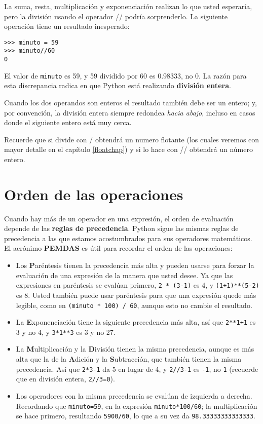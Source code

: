 La suma, resta, multiplicación y exponenciación realizan lo que usted
esperaría, pero la división usando el operador // podría sorprenderlo.
La siguiente operación tiene un resultado inesperado:

\begin{lstlisting}
>>> minuto = 59
>>> minuto//60
0
\end{lstlisting}

El valor de \texttt{minuto} es 59, y 59 dividido por 60 es 0.98333,
no 0. La razón para esta discrepancia radica en que Python está realizando
\textbf{división entera}.


Cuando los dos operandos son enteros el resultado también debe ser
un entero; y, por convención, la división entera siempre redondea
{\em hacia abajo}, incluso en casos donde el siguiente entero está
muy cerca.

Recuerde que si divide con / obtendrá un numero flotante (los cuales
veremos con mayor detalle en el capítulo \ref{floatchap}) y si lo
hace con // obtendrá un número entero. 

\section{Orden de las operaciones}

 

Cuando hay más de un operador en una expresión, el orden de evaluación
depende de las \textbf{reglas de precedencia}. Python sigue las mismas
reglas de precedencia a las que estamos acostumbrados para sus operadores
matemáticos. El acrónimo \textbf{PEMDAS} es útil para recordar el
orden de las operaciones:
\begin{itemize}
\item Los \textbf{P}aréntesis tienen la precedencia más alta y pueden usarse
para forzar la evaluación de una expresión de la manera que usted
desee. Ya que las expresiones en paréntesis se evalúan primero, \texttt{2
{*} (3-1)} es 4, y \texttt{(1+1){*}{*}(5-2)} es 8. Usted también puede
usar paréntesis para que una expresión quede más legible, como en
\texttt{(minuto {*} 100) / 60}, aunque esto no cambie el resultado.
\item La \textbf{E}xponenciación tiene la siguiente precedencia más alta,
así que \texttt{2{*}{*}1+1} es 3 y no 4, y \texttt{3{*}1{*}{*}3} es
3 y no 27.
\item La \textbf{M}ultiplicación y la \textbf{D}ivisión tienen la misma
precedencia, aunque es más alta que la de la \textbf{A}dición y la
\textbf{S}ubtracción, que también tienen la misma precedencia. Así
que \texttt{2{*}3-1} da 5 en lugar de 4, y \texttt{2//3-1} es \texttt{-1},
no \texttt{1} (recuerde que en división entera, \texttt{2//3=0}).
\item Los operadores con la misma precedencia se evalúan de izquierda a
derecha. Recordando que \texttt{minuto=59}, en la expresión \texttt{minuto{*}100/60};
la multiplicación se hace primero, resultando \texttt{5900/60}, lo
que a su vez da \texttt{98.33333333333333}.
\end{itemize}

